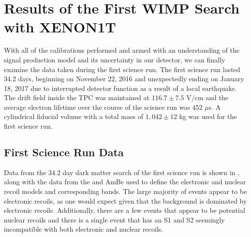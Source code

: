 \section{Results of the First WIMP Search with XENON1T}
\label{sec:xe1t_wimp_results}

With all of the calibrations performed and armed with an understanding of the signal production model and its uncertainty in our detector, we can finally examine the data taken during the first science run.  The first science run lasted 34.2 days, beginning on November 22, 2016 and unexpectedly ending on January 18, 2017 due to interrupted detector function as a result of a local earthquake.  The drift field inside the TPC was maintained at $116.7 \pm 7.5$ V/cm and the average electron lifetime over the course of the science run was 452 $\mu$s.  A cylindrical fiducial volume with a total mass of $1,042 \pm 12$ kg was used for the first science run.


\subsection{First Science Run Data}

Data from the 34.2 day dark matter search of the first science run is shown in , along with the data from the  and AmBe used to define the electronic and nuclear recoil models and corresponding bands.  The large majority of events appear to be electronic recoils, as one would expect given that the background is dominated by electronic recoils.  Additionally, there are a few events that appear to be potential nuclear recoils and there is a single event that has an S1 and S2 seemingly incompatible with both electronic and nuclear recoils.  

